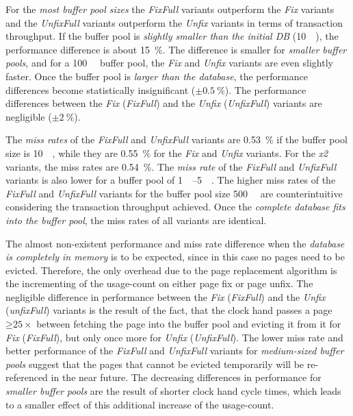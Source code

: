     For the \emph{most buffer pool sizes} the \emph{FixFull} variants outperform the \emph{Fix} variants and the \emph{UnfixFull} variants outperform the \emph{Unfix} variants in terms of transaction throughput. If the buffer pool is \emph{slightly smaller than the initial DB} (\SI{10}{\giga\byte}), the performance difference is about \SI{15}{\percent}. The difference is smaller for \emph{smaller buffer pools}, and for a \SI{100}{\mega\byte} buffer pool, the \emph{Fix} and \emph{Unfix} variants are even slightly faster. Once the buffer pool is \emph{larger than the database}, the performance differences become statistically insignificant ($\pm\SI{0.5}{\percent}$). The performance differences between the \emph{Fix} (\emph{FixFull}) and the \emph{Unfix} (\emph{UnfixFull}) variants are negligible ($\pm\SI{2}{\percent}$).

    The \emph{miss rates} of the \emph{FixFull} and \emph{UnfixFull} variants are \SI{0.53}{\percent} if the buffer pool size is \SI{10}{\giga\byte}, while they are \SI{0.55}{\percent} for the \emph{Fix} and \emph{Unfix} variants. For the \emph{x2} variants, the miss rates are \SI{0.54}{\percent}. The \emph{miss rate} of the \emph{FixFull} and \emph{UnfixFull} variants is also lower for a buffer pool of \SIrange{1}{5}{\giga\byte}. The higher miss rates of the \emph{FixFull} and \emph{UnfixFull} variants for the buffer pool size \SI{500}{\mega\byte} are counterintuitive considering the transaction throughput achieved. Once the \emph{complete database fits into the buffer pool}, the miss rates of all variants are identical.

    The almost non-existent performance and miss rate difference when the \emph{database is completely in memory} is to be expected, since in this case no pages need to be evicted. Therefore, the only overhead due to the page replacement algorithm is the incrementing of the usage-count on either page fix or page unfix. The negligible difference in performance between the \emph{Fix} (\emph{FixFull}) and the \emph{Unfix} (\emph{unfixFull}) variants is the result of the fact, that the clock hand passes a page $\mathord{\geq} 25\times$ between fetching the page into the buffer pool and evicting it from it for \emph{Fix} (\emph{FixFull}), but only once more for \emph{Unfix} (\emph{UnfixFull}). The lower miss rate and better performance of the \emph{FixFull} and \emph{UnfixFull} variants for \emph{medium-sized buffer pools} suggest that the pages that cannot be evicted temporarily will be re-referenced in the near future. The decreasing differences in performance for \emph{smaller buffer pools} are the result of shorter clock hand cycle times, which leads to a smaller effect of this additional increase of the usage-count.

